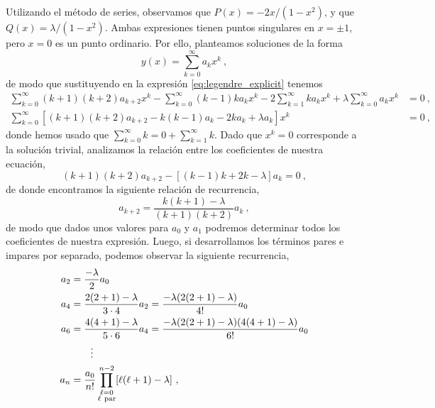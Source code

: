 
Utilizando el método de series, observamos que $P(x) = -2x/(1-x^2)$, y que $Q(x) = \lambda/(1-x^2)$. Ambas expresiones tienen puntos singulares en $x = \pm 1$, pero $x=0$ es un punto ordinario. Por ello, planteamos soluciones de la forma
\begin{equation}
        y(x) = \sum_{k=0}^{\infty} a_k x^k \ ,
\end{equation}
de modo que sustituyendo en la expresión \eqref{eq:legendre_explicit} tenemos 
\begin{align*}
    \sum_{k=0}^{\infty} (k+1)(k+2) a_{k+2} x^k - \sum_{k=0}^{\infty} (k-1) k a_k x^k - 2 \sum_{k=1}^{\infty} k a_k x^k + \lambda \sum_{k=0}^{\infty} a_k x^k & = 0 \ , \\
    \sum_{k=0}^{\infty} \left[ (k+1)(k+2) a_{k+2} - k(k-1)a_k  - 2k a_k + \lambda a_k \right]x^k & = 0 \ ,
\end{align*}
donde hemos usado que $\sum_{k=0}^{\infty} k = 0 + \sum_{k=1}^{\infty} k$. Dado que $x^k = 0$ corresponde a la solución trivial, analizamos la relación entre los coeficientes de nuestra ecuación,
\begin{equation}
    (k+1)(k+2) a_{k+2} - [(k-1) k + 2k - \lambda]a_k = 0 \ ,
\end{equation}
de donde encontramos la siguiente relación de recurrencia,
\begin{equation}\label{eq:recurrencia_legendre}
    a_{k+2} = \frac{k(k+1) - \lambda}{(k+1)(k+2)}a_k \ ,
\end{equation}
de modo que dados unos valores para $a_0$ y $a_1$ podremos determinar todos los coeficientes de nuestra expresión. Luego, si desarrollamos los términos pares e impares por separado, podemos observar la siguiente recurrencia,
\begin{align*}
    a_2 & = \frac{-\lambda}{2} a_0 \\
    a_4 & = \frac{2(2+1) - \lambda}{3 \cdot 4} a_2 = \frac{-\lambda(2(2+1)-\lambda)}{4!}a_0 \\
    a_6 & = \frac{4(4+1) - \lambda}{5 \cdot 6} a_4 = \frac{-\lambda (2(2+1)-\lambda)(4(4+1)-\lambda)}{6!} a_0 \\
    & \qquad \vdots \\
    a_n & = \frac{a_0}{n!}\prod_{\substack{\ell=0 \\ \ell \mbox{ \scriptsize{par}}}}^{n-2}[\ell (\ell+1) - \lambda] \ ,
\end{align*}
